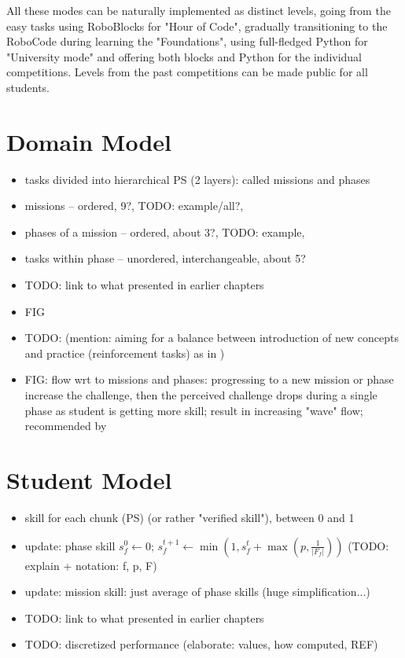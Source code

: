 All these modes can be naturally implemented as distinct levels,
going from the easy tasks using RoboBlocks for "Hour of Code",
gradually transitioning to the RoboCode during learning the "Foundations",
using full-fledged Python for "University mode"
and offering both blocks and Python for the individual competitions.
Levels from the past competitions can be made public for all students.


\section{Domain Model}

\begin{itemize}
\item tasks divided into hierarchical PS (2 layers): called missions and phases
\item missions -- ordered, 9?, TODO: example/all?,
\item phases of a mission -- ordered, about 3?, TODO: example,
\item tasks within phase -- unordered, interchangeable, about 5?
\item TODO: link to what presented in earlier chapters
\item FIG
\item TODO: (mention: aiming for a balance between introduction of new concepts
and practice (reinforcement tasks) as in \cite{progression-analysis})
\item FIG: flow wrt to missions and phases:
  progressing to a new mission or phase increase the challenge,
  then the perceived challenge drops during a single phase as student is getting
  more skill; result in increasing "wave" flow; recommended by \cite{book-of-lenses}
\end{itemize}


\section{Student Model}

\begin{itemize}
\item skill for each chunk (PS) (or rather "verified skill"), between 0 and 1
\item update: phase skill $s^0_f \leftarrow 0$;
  $s^{t+1}_f \leftarrow \min(1, s^t_f + \max(p, \frac{1}{|F_f|}))$
  (TODO: explain + notation: f, p, F)
\item update: mission skill: just average of phase skills (huge simplification...)
\item TODO: link to what presented in earlier chapters
\item TODO: discretized performance (elaborate: values, how computed, REF)
\end{itemize}


